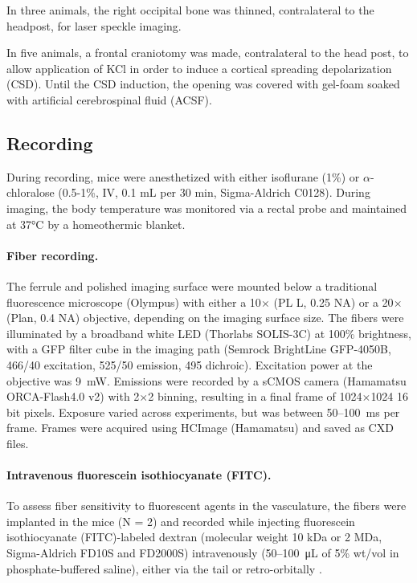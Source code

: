 In three animals, the right occipital bone 
was thinned, contralateral to the headpost, for laser speckle imaging.

In five animals, a frontal craniotomy was made, contralateral to 
the head post, to allow application of KCl in order to induce a 
cortical spreading depolarization (CSD). Until the CSD induction, the 
opening was covered with gel-foam soaked with artificial 
cerebrospinal fluid (ACSF).

\subsection{Recording}

During recording, mice were anesthetized with either isoflurane (1\%) 
or $\alpha$-chloralose (0.5-1\%, IV, 0.1 \si{\milli\liter} per 30 min, 
Sigma-Aldrich C0128). During imaging, the body 
temperature was monitored via a rectal probe and maintained at 
37\si{\celsius} by a homeothermic blanket.


\paragraph{Fiber recording.} The ferrule and polished imaging surface were mounted
 below a traditional fluorescence microscope (Olympus) with either a 
10$\times$ (PL L, 0.25 NA) or a 20$\times$ (Plan, 0.4 NA) objective, 
depending on the imaging surface size. The fibers were illuminated by 
a broadband white LED (Thorlabs SOLIS-3C) at 100\% brightness, with a 
GFP filter cube in the imaging path (Semrock BrightLine GFP-4050B, 
466/40 excitation, 525/50 emission, 495 dichroic). Excitation power at
 the objective was 9~\si{\milli\watt}. Emissions were recorded by a 
sCMOS camera (Hamamatsu ORCA-Flash4.0 v2) with 2$\times$2 binning, 
resulting in a final frame of 1024$\times$1024 16 bit pixels. Exposure
 varied across experiments, but was between 50--100~ms per frame. 
Frames were acquired using HCImage (Hamamatsu) and saved as CXD files.



\paragraph{Intravenous fluorescein isothiocyanate (FITC).} To assess fiber sensitivity to 
fluorescent agents in the vasculature, the fibers were implanted in 
the mice (N = 2) and recorded while injecting fluorescein 
isothiocyanate (FITC)-labeled dextran (molecular weight 10 kDa or 2 
MDa, Sigma-Aldrich FD10S and FD2000S) intravenously 
(50--100~\si{\micro\liter} of 5\% wt/vol in phosphate-buffered 
saline), either via the tail or retro-orbitally \cite{Yardeni:2011fs}.



